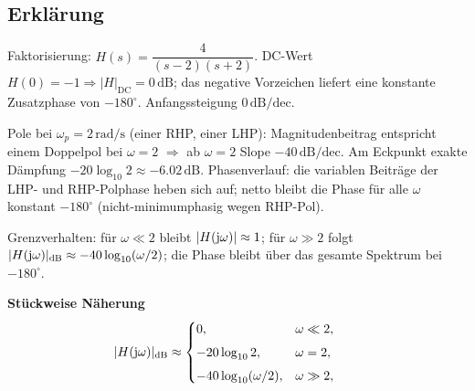 \subsection{Erklärung}
\vspace{5mm}
\begin{description}[leftmargin=1.2em,labelsep=.6em,font=\bfseries]
\item[Schritt 1] Faktorisierung: $H(s)=\dfrac{4}{(s-2)(s+2)}$. DC-Wert $H(0)=-1\Rightarrow |H|_{\mathrm{DC}}=0\,\mathrm{dB}$; das negative Vorzeichen liefert eine konstante Zusatzphase von $-180^\circ$. Anfangssteigung $0\,\mathrm{dB/dec}$.
\item[Schritt 2] Pole bei $\omega_p=2\,\mathrm{rad/s}$ (einer RHP, einer LHP): Magnitudenbeitrag entspricht einem Doppelpol bei $\omega=2$ $\Rightarrow$ ab $\omega=2$ Slope $-40\,\mathrm{dB/dec}$. Am Eckpunkt exakte Dämpfung $-20\log_{10}2\approx-6.02\,\mathrm{dB}$. Phasenverlauf: die variablen Beiträge der LHP- und RHP-Polphase heben sich auf; netto bleibt die Phase für alle $\omega$ konstant $-180^\circ$ (nicht-minimumphasig wegen RHP-Pol).
\item[Schritt 3] Grenzverhalten: für $\omega\ll2$ bleibt $|H(\operatorname{j}\!\omega)|\approx1$; für $\omega\gg2$ folgt $|H(\operatorname{j}\!\omega)|_{\mathrm{dB}}\approx-40\log_{10}(\omega/2)$; die Phase bleibt über das gesamte Spektrum bei $-180^\circ$.
\end{description}

\vspace{0.5cm}
\medskip
\noindent\textbf{Stückweise Näherung}
\[
|H(\operatorname{j}\!\omega)|_{\mathrm{dB}}\approx
\begin{cases}
0,& \omega\ll2,\\[4pt]
-20\log_{10}2,& \omega=2,\\[4pt]
-40\log_{10}(\omega/2),& \omega\gg2,
\end{cases}
\qquad
\]
\newpage